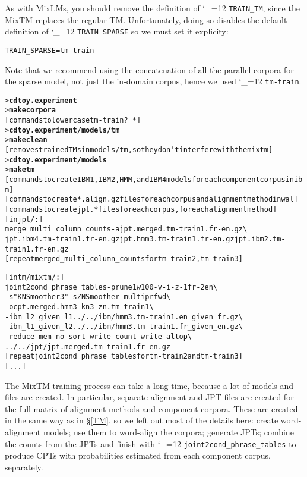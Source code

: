 \documentclass[11pt,letterpaper]{article}
\newcommand{\bs}{\textbackslash{}}
\def\code{\begingroup\catcode`\_=12 \codex}
\newcommand{\codex}[1]{\texttt{#1}\endgroup}
\begin{document}
As with MixLMs, you should remove the definition of \code{TRAIN_TM}, since the
MixTM replaces the regular TM.
Unfortunately, doing so disables the default definition of \code{TRAIN_SPARSE}
so we must set it explicity:
\begin{small}
\begin{alltt}
   TRAIN_SPARSE = tm-train
\end{alltt}
\end{small}
Note that we recommend using the concatenation of all the parallel corpora for
the sparse model, not just the in-domain corpus, hence we used \code{tm-train}.

\begin{small}
\begin{alltt}
   > \textbf{cd toy.experiment}
   > \textbf{make corpora}
   [commands to lowercase tm-train?_*]
   > \textbf{cd toy.experiment/models/tm}
   > \textbf{make clean}
   [removes trained TMs in models/tm, so they don't interfere with the mixtm]
   > \textbf{cd toy.experiment/models}
   > \textbf{make tm}
   [commands to create IBM1, IBM2, HMM, and IBM4 models for each component corpus in ibm]
   [commands to create *.align.gz files for each corpus and alignment method in wal]
   [commands to create jpt.* files for each corpus, for each alignment method]
   [in jpt/:]
   merge_multi_column_counts -a jpt.merged.tm-train1.fr-en.gz \bs
      jpt.ibm4.tm-train1.fr-en.gz jpt.hmm3.tm-train1.fr-en.gz jpt.ibm2.tm-train1.fr-en.gz
   [repeat merged_multi_column_counts for tm-train2, tm-train3]

   [in tm/mixtm/:]
   joint2cond_phrase_tables -prune1w 100 -v -i -z -1 fr -2 en \bs
      -s "KNSmoother 3" -s ZNSmoother -multipr fwd \bs
      -o cpt.merged.hmm3-kn3-zn.tm-train1 \bs
      -ibm_l2_given_l1  ../../ibm/hmm3.tm-train1.en_given_fr.gz \bs
      -ibm_l1_given_l2  ../../ibm/hmm3.tm-train1.fr_given_en.gz \bs
      -reduce-mem -no-sort -write-count -write-al top \bs
      ../../jpt/jpt.merged.tm-train1.fr-en.gz
   [repeat joint2cond_phrase_tables for tm-train2 and tm-train3]
   [...]
\end{alltt}
\end{small}

The MixTM training process can take a long time, because a lot of models and
files are created. In particular, separate alignment and JPT files are created
for the full matrix of alignment methods and component corpora.  These are
created in the same way as in \S\ref{TM}, so we left out most of the details
here: create word-alignment models; use them to word-align the corpora;
generate JPTs; combine the counts from the JPTs and finish with
\code{joint2cond_phrase_tables} to produce CPTs with probabilities estimated
from each component corpus, separately.
\end{document}
